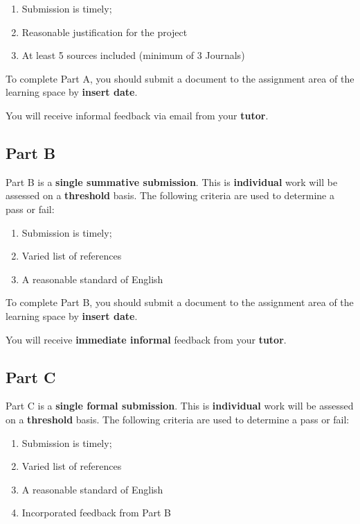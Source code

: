 \documentclass{../fal_assignment}
\begin{document}
\begin{enumerate}[label=(\alph*)]
	\item Submission is timely;
	\item Reasonable justification for the project
	\item At least 5 sources included (minimum of 3 Journals)
\end{enumerate}

To complete Part A, you should submit a document to the assignment area of the learning space by \textbf{insert date}.

You will receive informal feedback via email from your \textbf{tutor}.

\subsection*{Part B}

Part B is a \textbf{single summative submission}. This is \textbf{individual} work will be assessed on a \textbf{threshold} basis. The following criteria are used to determine a pass or fail: 

\begin{enumerate}[label=(\alph*)]
	\item Submission is timely;
	\item Varied list of references
	\item A reasonable standard of English
\end{enumerate}

To complete Part B, you should submit a document to the assignment area of the learning space by \textbf{insert date}.

You will receive \textbf{immediate informal} feedback from your \textbf{tutor}.


\subsection*{Part C}

Part C is a \textbf{single formal submission}. This is \textbf{individual} work will be assessed on a \textbf{threshold} basis. The following criteria are used to determine a pass or fail: 

\begin{enumerate}[label=(\alph*)]
	\item Submission is timely;
	\item Varied list of references
	\item A reasonable standard of English
	\item Incorporated feedback from Part B
\end{enumerate}
\end{document}
